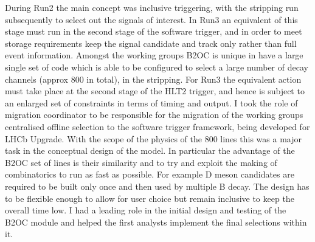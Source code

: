During Run2 the main concept was inclusive triggering, with the stripping run subsequently to select out the signals of interest. In Run3 an equivalent of this stage must run in the second stage of the software trigger, and in order to meet storage requirements keep the signal candidate and track only rather than full event information. Amongst the working groups B2OC is unique in have a large single set of code which is able to be configured to select a large number of decay channels (approx 800 in total), in the stripping. For Run3 the equivalent action must take place at the second stage of the HLT2 trigger, and hence is subject to an enlarged set of constraints in terms of timing and output. I took the role of migration coordinator to be responsible for the migration of the working groups centralised offline selection to the software trigger framework, being developed for LHCb Upgrade. With the scope of the physics of the 800 lines this was a major task in the conceptual design of the model. In particular the advantage of the B2OC set of lines is their similarity and to try and exploit the making of combinatorics to run as fast as possible. For example D meson candidates are required to be built only once and then used by multiple B decay. The design has to be flexible enough to allow for user choice but remain inclusive to keep the overall time low. I had a leading role in the initial design and testing of the B2OC module and helped the first analysts implement the final selections within it.
